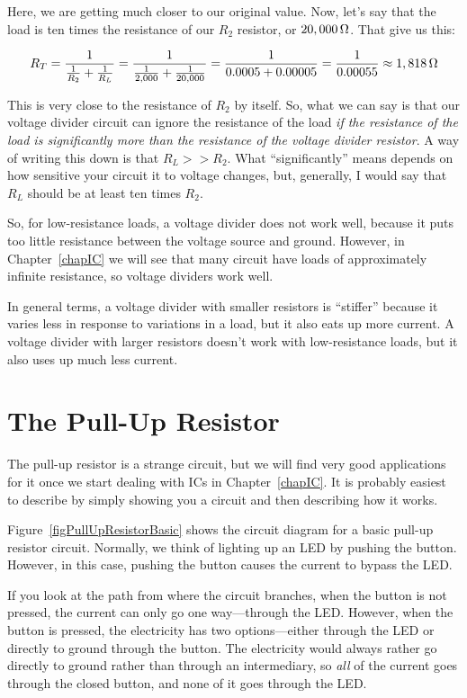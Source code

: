 Here, we are getting much closer to our original value.  Now, let's say that the load is ten times the resistance of our $R_2$ resistor, or $20,000\,\si{\ohm}$.  That give us this:

$$ R_T = \frac{1}{\frac{1}{R_2} + \frac{1}{R_L}} = \frac{1}{\frac{1}{2,000} + \frac{1}{20,000}} = \frac{1}{0.0005 + 0.00005} = \frac{1}{0.00055} \approx 1,818\,\si{\ohm} $$

This is very close to the resistance of $R_2$ by itself.
So, what we can say is that our voltage divider circuit can ignore the resistance of the load \emph{if the resistance of the load is significantly more than the resistance of the voltage divider resistor}.
A way of writing this down is that $R_L >> R_2$.
What ``significantly'' means depends on how sensitive your circuit it to voltage changes, but, generally, I would say that $R_L$ should be at least ten times $R_2$.

So, for low-resistance loads, a voltage divider does not work well, because it puts too little resistance between the voltage source and ground.
However, in Chapter~\ref{chapIC} we will see that many circuit have loads of approximately infinite resistance, so voltage dividers work well.

In general terms, a voltage divider with smaller resistors is ``stiffer'' because it varies less in response to variations in a load, but it also eats up more current.
A voltage divider with larger resistors doesn't work with low-resistance loads, but it also uses up much less current.

\section{The Pull-Up Resistor}
\label{secPullUpResistor}

The pull-up resistor is a strange circuit, but we will find very good applications for it once we start dealing with ICs in Chapter~\ref{chapIC}.
It is probably easiest to describe by simply showing you a circuit and then describing how it works.


Figure~\ref{figPullUpResistorBasic} shows the circuit diagram for a basic pull-up resistor circuit.
Normally, we think of lighting up an LED by pushing the button.
However, in this case, pushing the button causes the current to bypass the LED.

If you look at the path from where the circuit branches, when the button is not pressed, the current can only go one way---through the LED.
However, when the button is pressed, the electricity has two options---either through the LED or directly to ground through the button.
The electricity would always rather go directly to ground rather than through an intermediary, so \emph{all} of the current goes through the closed button, and none of it goes through the LED.

